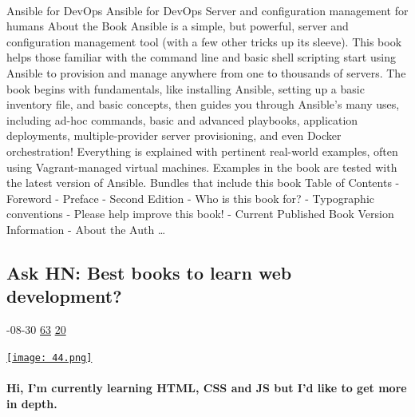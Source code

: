 \documentclass[10pt,a4paper]{article}
\begin{document}
\begin{multicols}{2}
\paragraph{}
Ansible for DevOps
Ansible for DevOps
Server and configuration management for humans
About the Book
Ansible is a simple, but powerful, server and configuration management tool (with a few other tricks up its sleeve). This book helps those familiar with the command line and basic shell scripting start using Ansible to provision and manage anywhere from one to thousands of servers.
The book begins with fundamentals, like installing Ansible, setting up a basic inventory file, and basic concepts, then guides you through Ansible's many uses, including ad-hoc commands, basic and advanced playbooks, application deployments, multiple-provider server provisioning, and even Docker orchestration! Everything is explained with pertinent real-world examples, often using Vagrant-managed virtual machines.
Examples in the book are tested with the latest version of Ansible.
Bundles that include this book
Table of Contents
- Foreword
-
Preface
- Second Edition
- Who is this book for?
- Typographic conventions
-
Please help improve this book!
- Current Published Book Version Information
- About the Auth
\dots\par
\noindent\begin{minipage}{\linewidth}
\medskip
\subsection{Ask HN: Best books to learn web development?}
\textsc{\footnotesize
{\scriptsize\faCalendar}-08-30 
{\scriptsize\faThumbsOUp}\space 
\href{}{63} 
{\scriptsize\faComments}\space 
\href{}{20} 
}
\par\medskip\noindent
\href{https://news.ycombinator.com/item?id=37325594\&utm\_source=hackernewsletter\&utm\_medium=email\&utm\_term=books}{
    \texttt{[image: 44.png]}
}
\end{minipage}
\paragraph{}
\textbf{Hi, I'm currently learning HTML, CSS and JS but I'd like to get more in depth.}

\end{multicols}
\end{document}
